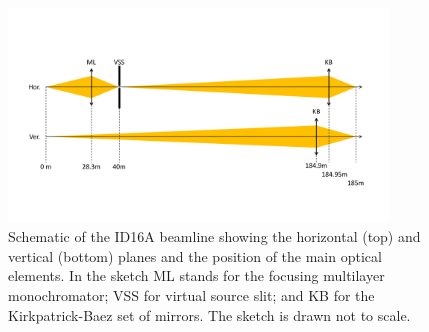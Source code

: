 \documentclass{iucr}              %
\newcommand{\inred}[1]{{\color{black}#1}}
\begin{document}
\begin{figure}\label{fig:ID16A}
    \centering
    \includegraphics[width=0.9\textwidth,clip=true,trim=50 85 50 85]{GRAPHICS/ID16A.pdf}
    \caption{Schematic of the ID16A beamline showing the horizontal (top) and vertical (bottom) planes and the position of the main optical elements. In the sketch ML stands for the focusing multilayer monochromator; VSS for virtual source slit; and KB for the Kirkpatrick-Baez set of mirrors. The sketch is drawn \inred{not to} scale.}
\end{figure}


\begin{table}\label{tab:Positions}
    \caption{Position of the main ID16A optical elements with respect to the source (undulator centre). It also shows the values for horizontal and vertical demagnification $M^{-1}=p/q$, where $p$ and $q$ are the the distances object-optics and optics-image, respectively.}
\end{table}

\end{document}
